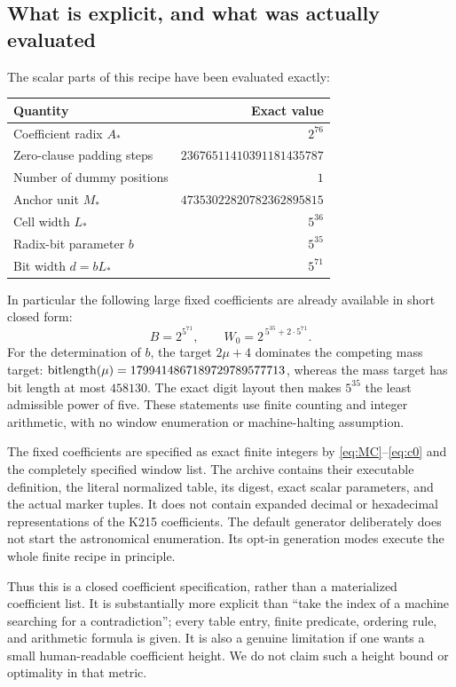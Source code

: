 \documentclass[11pt]{article}
\theoremstyle{remark}\newtheorem{remark}[theorem]{Remark}
\begin{document}
\subsection{What is explicit, and what was actually evaluated}

The scalar parts of this recipe have been evaluated exactly:
\begin{center}
\begin{tabular}{@{}lr@{}}
\toprule
Quantity & Exact value\\\midrule
Coefficient radix $A_*$ & $2^{76}$\\
Zero-clause padding steps & $23676511410391181435787$\\
Number of dummy positions & $1$\\
Anchor unit $M_*$ & $47353022820782362895815$\\
Cell width $L_*$ & $5^{36}$\\
Radix-bit parameter $b$ & $5^{35}$\\
Bit width $d=bL_*$ & $5^{71}$\\\bottomrule
\end{tabular}
\end{center}
In particular the following large fixed coefficients are already
available in short closed form:
\begin{equation}\label{eq:exactradix}
 \boxed{\quad B=2^{5^{71}},\qquad
 W_0=2^{\,5^{35}+2\cdot5^{71}}.\quad}
\end{equation}
For the determination of $b$, the target $2\mu+4$ dominates the
competing mass target: $\operatorname{bitlength}(\mu)=1799414867189729789577713$,
whereas the mass target has bit length at most $458130$.
The exact digit layout then makes $5^{35}$ the least admissible
power of five. These statements use finite counting and integer
arithmetic, with no window enumeration or machine-halting assumption.

The fixed coefficients are specified as exact finite integers by
\eqref{eq:MC}--\eqref{eq:c0} and the completely specified window list.
The archive contains their executable definition, the literal
normalized table, its digest, exact scalar parameters, and the actual marker tuples. It does
not contain expanded decimal or hexadecimal representations of the
K215 coefficients. The default generator deliberately does not start
the astronomical enumeration. Its opt-in generation modes execute
the whole finite recipe in principle.

Thus this is a closed coefficient specification, rather than a
materialized coefficient list. It is substantially more explicit
than ``take the index of a machine searching for a contradiction'';
every table entry, finite predicate, ordering rule, and arithmetic
formula is given. It is also a genuine limitation if one wants a
small human-readable coefficient height. We do not claim such a
height bound or optimality in that metric.
\end{document}
